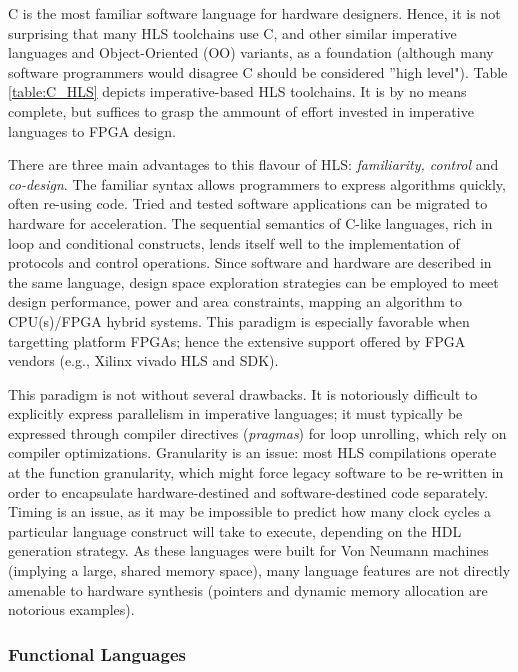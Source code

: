 C is the most familiar software language for hardware designers. Hence, it is not surprising that many HLS toolchains use C, and other similar imperative languages and Object-Oriented (OO) variants, as a foundation (although many software programmers would disagree C should be considered ''high level"). Table \ref{table:C_HLS} depicts imperative-based HLS toolchains. It is by no means complete, but suffices to grasp the ammount of effort invested in imperative languages to FPGA design.
\par There are three main advantages to this flavour of HLS: \textit{familiarity, control} and \textit{co-design}. The familiar syntax allows programmers to express algorithms quickly, often re-using code. Tried and tested software applications can be migrated to hardware for acceleration. The sequential semantics of C-like languages, rich in loop and conditional constructs, lends itself well to the implementation of protocols and control operations. Since software and hardware are described in the same language, design space exploration strategies can be employed to meet design performance, power and area constraints, mapping an algorithm to CPU(s)/FPGA hybrid systems. This paradigm is especially favorable when targetting platform FPGAs; hence the extensive support offered by FPGA vendors (e.g., Xilinx vivado HLS and SDK).
\par This paradigm is not without several drawbacks. It is notoriously difficult to explicitly express parallelism in imperative languages; it must typically be expressed through compiler directives (\textit{pragmas}) for loop unrolling, which rely on compiler optimizations. Granularity is an issue: most HLS compilations operate at the function granularity, which might force legacy software to be re-written in order to encapsulate hardware-destined and software-destined code separately. Timing is an issue, as it may be impossible to predict how many clock cycles a particular language construct will take to execute, depending on the HDL generation strategy. As these languages were built for Von Neumann machines (implying a large, shared memory space), many language features are not directly amenable to hardware synthesis (pointers and dynamic memory allocation are notorious examples). 






\subsubsection{Functional Languages}

